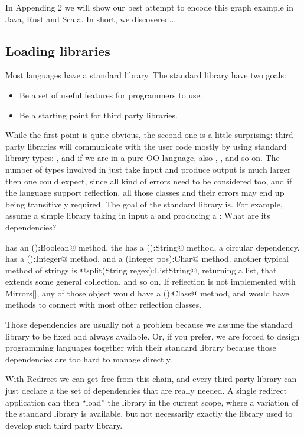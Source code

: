 In Appending 2 we will show our best attempt to encode this graph example in Java, Rust and Scala.
In short, we discovered...

\subsection{Loading libraries}

Most languages have a standard library.
The standard library have two goals:
\begin{itemize}
\item Be a set of useful features for programmers to use.
\item Be a starting point for third party libraries.
\end{itemize}
While the first point is quite obvious, the second one is a little surprising: third party libraries will communicate with
the user code mostly by using standard library types:
\Q@String@s, \Q@Collection@s and if we are in a pure OO language,
also \Q@Boolean@s, \Q@Integer@s, \Q@Double@s and so on.
The number of types involved in just take input and produce output is much larger then one could expect, since all kind of errors need
to be considered too, and if the language support reflection, all those classes and their errors may end up being transitively required.
The goal of the standard library is.
For example, assume a simple library taking in input a \Q@String@
and producing a \Q@String@: What are its dependencies?

\Q@String@ has an \Q@isEmpty():Boolean@ method, 
the \Q@Boolean@ has a \Q@toString():String@ method, a circular dependency.
\Q@String@ has a \Q@size():Integer@ method, and
a \Q@getChar(Integer pos):Char@ method.
another typical method of strings is @split(String regex):ListString@,
returning a list, that extends some general collection, and so on.
If reflection is not implemented with Mirrors[],
any of those object would have a \Q@class():Class@ method,
and \Q@Class@ would have methods to connect with most other reflection classes.

Those dependencies are usually not a problem because we assume the standard library to be fixed and always available.
Or, if you prefer, we are forced to design programming languages together with their standard library because those dependencies are too hard to manage directly.

With Redirect we can get free from this chain, and every third party library can just declare a the set of dependencies that are really needed.
A single redirect application can then ``load'' the library in the current scope, where a variation of the standard library is available, but not necessarily exactly the library used to develop such third party library.

